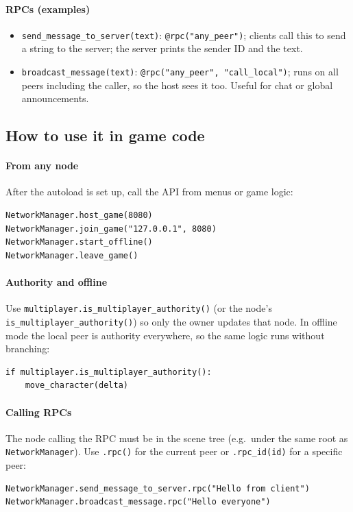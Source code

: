 \documentclass{article}
\begin{document}
\paragraph*{RPCs (examples)}
\begin{itemize}
  \item \texttt{send\_message\_to\_server(text)}: \texttt{@rpc("any\_peer")};
    clients call this to send a string to the server; the server prints
    the sender ID and the text.
  \item \texttt{broadcast\_message(text)}: \texttt{@rpc("any\_peer",
    "call\_local")}; runs on all peers including the caller, so the host
    sees it too. Useful for chat or global announcements.
\end{itemize}

\subsection*{How to use it in game code}

\paragraph*{From any node}
After the autoload is set up, call the API from menus or game logic:
\begin{verbatim}
NetworkManager.host_game(8080)
NetworkManager.join_game("127.0.0.1", 8080)
NetworkManager.start_offline()
NetworkManager.leave_game()
\end{verbatim}

\paragraph*{Authority and offline}
Use \texttt{multiplayer.is\_multiplayer\_authority()} (or the node's
\texttt{is\_multiplayer\_authority()}) so only the owner updates that
node. In offline mode the local peer is authority everywhere, so the
same logic runs without branching:
\begin{verbatim}
if multiplayer.is_multiplayer_authority():
    move_character(delta)
\end{verbatim}

\paragraph*{Calling RPCs}
The node calling the RPC must be in the scene tree (e.g.\ under the
same root as \texttt{NetworkManager}). Use \texttt{.rpc()} for the
current peer or \texttt{.rpc\_id(id)} for a specific peer:
\begin{verbatim}
NetworkManager.send_message_to_server.rpc("Hello from client")
NetworkManager.broadcast_message.rpc("Hello everyone")
\end{verbatim}
\end{document}
